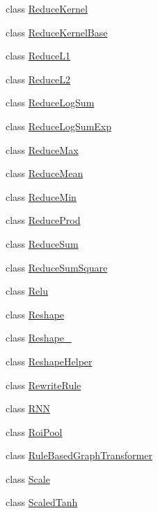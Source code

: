 \begin{DoxyCompactItemize}
\item 
class \mbox{\hyperlink{classonnxruntime_1_1ReduceKernel}{Reduce\+Kernel}}
\item 
class \mbox{\hyperlink{classonnxruntime_1_1ReduceKernelBase}{Reduce\+Kernel\+Base}}
\item 
class \mbox{\hyperlink{classonnxruntime_1_1ReduceL1}{Reduce\+L1}}
\item 
class \mbox{\hyperlink{classonnxruntime_1_1ReduceL2}{Reduce\+L2}}
\item 
class \mbox{\hyperlink{classonnxruntime_1_1ReduceLogSum}{Reduce\+Log\+Sum}}
\item 
class \mbox{\hyperlink{classonnxruntime_1_1ReduceLogSumExp}{Reduce\+Log\+Sum\+Exp}}
\item 
class \mbox{\hyperlink{classonnxruntime_1_1ReduceMax}{Reduce\+Max}}
\item 
class \mbox{\hyperlink{classonnxruntime_1_1ReduceMean}{Reduce\+Mean}}
\item 
class \mbox{\hyperlink{classonnxruntime_1_1ReduceMin}{Reduce\+Min}}
\item 
class \mbox{\hyperlink{classonnxruntime_1_1ReduceProd}{Reduce\+Prod}}
\item 
class \mbox{\hyperlink{classonnxruntime_1_1ReduceSum}{Reduce\+Sum}}
\item 
class \mbox{\hyperlink{classonnxruntime_1_1ReduceSumSquare}{Reduce\+Sum\+Square}}
\item 
class \mbox{\hyperlink{classonnxruntime_1_1Relu}{Relu}}
\item 
class \mbox{\hyperlink{classonnxruntime_1_1Reshape}{Reshape}}
\item 
class \mbox{\hyperlink{classonnxruntime_1_1Reshape__1}{Reshape\+\_}}
\item 
class \mbox{\hyperlink{classonnxruntime_1_1ReshapeHelper}{Reshape\+Helper}}
\item 
class \mbox{\hyperlink{classonnxruntime_1_1RewriteRule}{Rewrite\+Rule}}
\item 
class \mbox{\hyperlink{classonnxruntime_1_1RNN}{R\+NN}}
\item 
class \mbox{\hyperlink{classonnxruntime_1_1RoiPool}{Roi\+Pool}}
\item 
class \mbox{\hyperlink{classonnxruntime_1_1RuleBasedGraphTransformer}{Rule\+Based\+Graph\+Transformer}}
\item 
class \mbox{\hyperlink{classonnxruntime_1_1Scale}{Scale}}
\item 
class \mbox{\hyperlink{classonnxruntime_1_1ScaledTanh}{Scaled\+Tanh}}

\end{DoxyCompactItemize}
